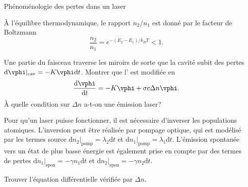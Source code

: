 \begin{exo}[PC][1][TD]{Phénoménologie des pertes dans un laser}
\begin{quest}
{À l'équilibre thermodynamique, le rapport $n_2/n_1$ est donné par le facteur de Boltzmann
$$
\frac{n_2}{n_1} = e^{-(E_2-E_1)/k_B T} < 1.
$$
}

\item Une partie du faisceau traverse les miroirs de sorte que la cavité subit des pertes $\mathrm{d} \vphi|_{\text{cav}} = - K\vphi \mathrm{d}t$. Montrer que l’ est modifiée en
\begin{equation}
\frac{\mathrm{d} \vphi}{\mathrm{d} t} = -K \vphi + \sigma c \Delta n \vphi .
\end{equation}
À quelle condition sur $\Delta n$ a-t-on une émission laser?
\end{quest}
Pour qu'un laser puisse fonctionner, il est nécessaire d'inverser les populations atomiques. L'inversion peut être réalisée par pompage optique, qui est modélisé par les termes source $\mathrm{d} n_2|_{\text{pomp}} = \lambda_2 \mathrm{d}t$ et $\mathrm{d} n_1|_{\text{pomp}} = \lambda_1 \mathrm{d}t$. L'émission spontanée vers un état de plus basse énergie est également prise en compte par des termes de pertes $\mathrm{d} n_1|_{\text{spon}} = -\gamma n_1 \mathrm{d}t$ et $\mathrm{d} n_2|_{\text{spon}} = -\gamma n_2 \mathrm{d}t$.
\begin{quest}
  \item Trouver l'équation différentielle vérifiée par $\Delta n$.
\end{quest}
\end{exo}
